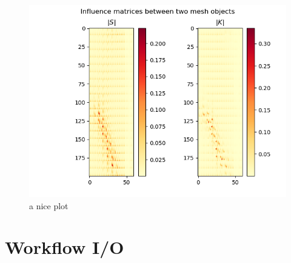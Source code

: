 \documentclass{article}
\begin{document}
\begin{figure}[h]
    \centering
    \includegraphics[width=1\textwidth]{img/2_3_infmatrix.png}
    \caption{a nice plot}
    \label{fig:plt4}
\end{figure}

\section{Workflow I/O}


\printbibliography
\end{document}
